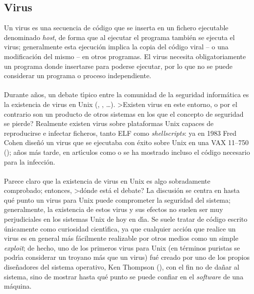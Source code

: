 \subsection{Virus}
Un virus es una secuencia de c\'odigo que se inserta en un fichero ejecutable
denominado {\it host}, de forma que al ejecutar el programa tambi\'en se
ejecuta el virus; generalmente esta ejecuci\'on implica la copia del c\'odigo
viral -- o una modificaci\'on del mismo -- en otros programas. El virus 
necesita obligatoriamente un programa 
donde insertarse para poderse ejecutar, por lo que no se puede considerar un
programa o proceso independiente.\\
\\Durante a\~nos, un debate t\'{\i}pico entre la comunidad de la seguridad 
inform\'atica es la existencia de virus en Unix (\cite{kn:rad92}, 
\cite{kn:rad93}, \cite{kn:rad95}\ldots). >Existen virus en este entorno, o por 
el contrario son un producto de otros sistemas en los que el concepto de 
seguridad se pierde? Realmente existen virus sobre plataformas Unix capaces de 
reproducirse e infectar ficheros, tanto ELF como {\it shellscripts}: ya en 1983 
Fred Cohen dise\~n\'o un virus que se ejecutaba con \'exito sobre Unix en una 
VAX 11--750 (\cite{kn:coh94}); a\~nos m\'as tarde, en art\'{\i}culos como 
\cite{kn:duf89} o \cite{kn:mci89} se ha mostrado incluso el c\'odigo necesario 
para la infecci\'on.\\
\\Parece claro que la existencia de virus en Unix es algo sobradamente
comprobado; entonces, >d\'onde est\'a el debate? La discusi\'on se centra en
hasta qu\'e punto un virus para Unix puede comprometer la seguridad del sistema;
generalmente, la existencia de estos virus y sus efectos no suelen ser muy 
perjudiciales en los sistemas Unix de hoy en d\'{\i}a. Se suele tratar de
c\'odigo escrito \'unicamente como curiosidad cient\'{\i}fica, ya que cualquier
acci\'on que realice un virus es en general m\'as f\'acilmente realizable por
otros medios como un simple {\it exploit}; de hecho, uno de los primeros virus
para Unix (en t\'erminos puristas se podr\'{\i}a considerar un 
troyano m\'as que un virus) fu\'e creado por uno de los propios dise\~nadores
del sistema operativo, Ken Thompson (\cite{kn:tho84}), con 
el fin no de da\~nar al sistema, sino de mostrar hasta qu\'e punto se puede 
confiar en el {\it software} de una m\'aquina.
